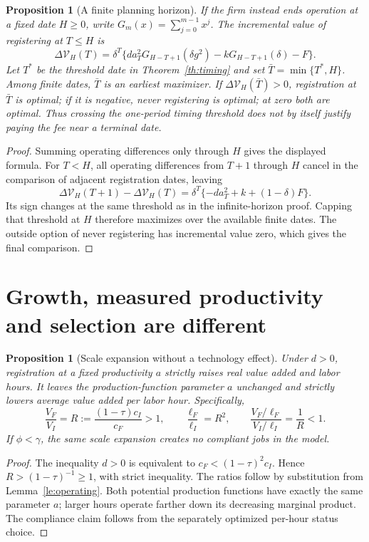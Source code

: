 \documentclass[11pt,a4paper]{article}
\newtheorem{proposition}[theorem]{Proposition}
\theoremstyle{definition}
\theoremstyle{remark}
\begin{document}
\begin{proposition}[A finite planning horizon]\label{pr:finite}
If the firm instead ends operation at a fixed date $H\geq0$, write
$G_m(x)=\sum_{j=0}^{m-1}x^j$. The incremental value of registering at $T\leq H$ is
\[
 \Delta\mathcal V_H(T)=\delta^T\{d a_T^2G_{H-T+1}(\delta g^2)
                         -kG_{H-T+1}(\delta)-F\}.
\]
Let $T^*$ be the threshold date in Theorem~\ref{th:timing} and set
$\bar T=\min\{T^*,H\}$. Among finite dates, $\bar T$ is an earliest maximizer.
If $\Delta\mathcal V_H(\bar T)>0$, registration at $\bar T$ is optimal;
if it is negative, never registering is optimal; at zero both are optimal.
Thus crossing the one-period timing threshold does not by itself justify
paying the fee near a terminal date.
\end{proposition}
\begin{proof}
Summing operating differences only through $H$ gives the displayed formula.
For $T<H$, all operating differences from $T+1$ through $H$ cancel in the
comparison of adjacent registration dates, leaving
\[
 \Delta\mathcal V_H(T+1)-\Delta\mathcal V_H(T)
 =\delta^T\{-d a_T^2+k+(1-\delta)F\}.
\]
Its sign changes at the same threshold as in the infinite-horizon proof.
Capping that threshold at $H$ therefore maximizes over the available finite
dates. The outside option of never registering has incremental value zero,
which gives the final comparison.
\end{proof}

\section{Growth, measured productivity and selection are different}
\begin{proposition}[Scale expansion without a technology effect]\label{pr:scale}
Under $d>0$, registration at a fixed productivity $a$ strictly raises real value added and labor hours. It leaves the production-function parameter $a$ unchanged and strictly lowers average value added per labor hour. Specifically,
\[
 \frac{V_F}{V_I}=R:=\frac{(1-\tau)c_I}{c_F}>1,
 \qquad \frac{\ell_F}{\ell_I}=R^2,
 \qquad \frac{V_F/\ell_F}{V_I/\ell_I}=\frac1R<1.
\]
If $\phi<\gamma$, the same scale expansion creates no compliant jobs in the model.
\end{proposition}
\begin{proof}
The inequality $d>0$ is equivalent to $c_F<(1-\tau)^2c_I$. Hence
$R>(1-\tau)^{-1}\geq1$, with strict inequality. The ratios follow by substitution from Lemma~\ref{le:operating}. Both potential production functions have exactly the same parameter $a$; larger hours operate farther down its decreasing marginal product. The compliance claim follows from the separately optimized per-hour status choice.
\end{proof}
\end{document}
